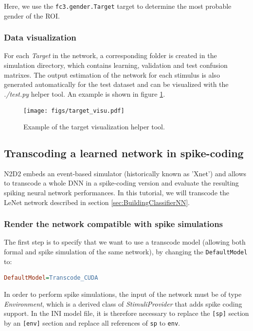 \documentclass[a4paper,11pt,oneside]{article}
\begin{document}
Here, we use the \lstinline!fc3.gender.Target! target to determine the most
probable gender of the ROI.

\subsubsection{Data visualization}

For each \emph{Target} in the network, a corresponding folder is created in the
simulation directory, which contains learning, validation and test confusion
matrixes. The output estimation of the network for each stimulus is also
generated automatically for the test dataset and can be visualized with the
\emph{./test.py} helper tool. An example is shown in figure
\ref{fig:targetvisu}.

\begin{figure}[!htb]
  \centering
  \texttt{[image: figs/target\_visu.pdf]}
  \caption{Example of the target visualization helper tool.}
  \label{fig:targetvisu}
\end{figure}


\subsection{Transcoding a learned network in spike-coding}

N2D2 embeds an event-based simulator (historically known as 'Xnet') and allows
to transcode a whole DNN in a spike-coding version and evaluate the resulting
spiking neural network performances. In this tutorial, we will transcode the
LeNet network described in section \ref{sec:BuildingClassifierNN}.

\subsubsection{Render the network compatible with spike simulations}

The first step is to specify that we want to use
a transcode model (allowing both formal and spike simulation of the same
network), by changing the \lstinline!DefaultModel! to:

\begin{lstlisting}[language=ini]
DefaultModel=Transcode_CUDA
\end{lstlisting}

In order to perform spike simulations, the input of the network must be of type
\emph{Environment}, which is a derived class of
\emph{StimuliProvider} that adds spike coding support. In the INI model
file, it is therefore necessary to replace the \lstinline![sp]! section by an
\lstinline![env]! section and replace all references of \lstinline!sp! to
\lstinline!env!.
\end{document}
